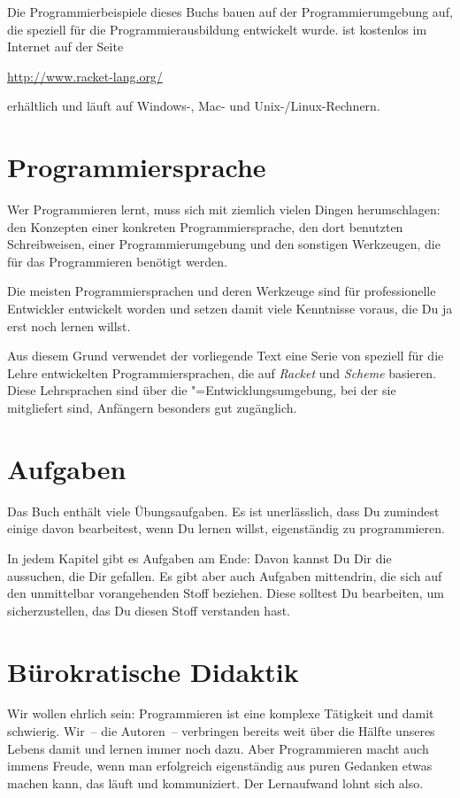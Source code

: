 Die Programmierbeispiele dieses Buchs bauen auf der
Programmierumgebung \drscheme{}\index{\drscheme{}} auf, die speziell
für die Programmierausbildung entwickelt wurde. 
\drscheme{} ist kostenlos im Internet auf der Seite
%
\begin{center}
  \url{http://www.racket-lang.org/}
\end{center}
%
erhältlich und läuft auf Windows-, Mac- und Unix-/Linux-Rechnern.

\section{Programmiersprache}

Wer Programmieren lernt, muss sich mit ziemlich vielen Dingen
herumschlagen: den Konzepten einer konkreten Programmiersprache, den
dort benutzten Schreibweisen, einer Programmierumgebung und den
sonstigen Werkzeugen, die für das Programmieren benötigt werden.

Die meisten Programmiersprachen und deren Werkzeuge sind für
professionelle Entwickler entwickelt worden und setzen damit viele
Kenntnisse voraus, die Du ja erst noch lernen willst.

Aus diesem Grund verwendet der vorliegende Text eine Serie von
speziell für die Lehre entwickelten Programmiersprachen, die auf
\textit{Racket} und \textit{Scheme}
basieren.  Diese Lehrsprachen sind über die
\drscheme"=Entwicklungsumgebung, bei der sie mitgliefert sind,
Anfängern besonders gut zugänglich.

\section{Aufgaben}

Das Buch enthält viele Übungsaufgaben.  Es ist unerlässlich, dass Du
zumindest einige davon bearbeitest, wenn Du lernen willst,
eigenständig zu programmieren.

In jedem Kapitel gibt es Aufgaben am Ende: Davon kannst Du Dir die
aussuchen, die Dir gefallen.  Es gibt aber auch Aufgaben mittendrin,
die sich auf den unmittelbar vorangehenden Stoff beziehen.  Diese
solltest Du bearbeiten, um sicherzustellen, das Du diesen Stoff
verstanden hast.

\section{Bürokratische Didaktik}

Wir wollen ehrlich sein: Programmieren ist eine komplexe Tätigkeit und
damit schwierig.  Wir~-- die Autoren~-- verbringen bereits weit über
die Hälfte unseres Lebens damit und lernen immer noch dazu.  Aber
Programmieren macht auch immens Freude, wenn man erfolgreich
eigenständig aus puren Gedanken etwas machen kann, das läuft und
kommuniziert.  Der Lernaufwand lohnt sich also.

